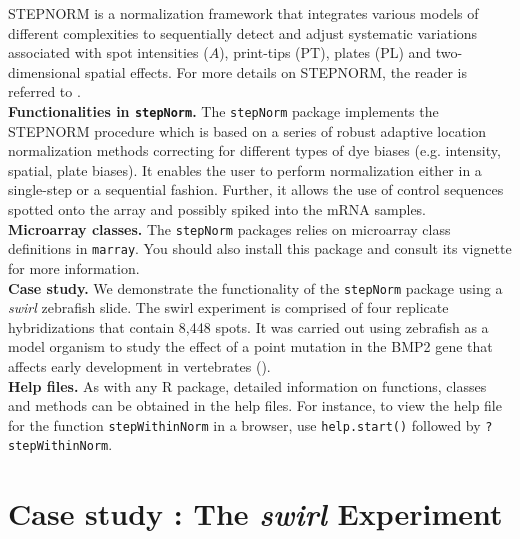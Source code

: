\documentclass[11pt]{article}
\newcommand{\code}[1]{{\tt #1}}
\newcommand{\Rfunc}[1]{{\tt #1}}
\begin{document}
STEPNORM is a normalization framework that integrates various models of different 
complexities to sequentially detect and adjust systematic variations associated with spot 
intensities ($A$), print-tips (PT), plates (PL) and two-dimensional spatial effects. 
For more details on STEPNORM, the reader is referred to \cite{stepNorm}. \\

{\bf Functionalities in \code{stepNorm}.} The \code{stepNorm} package implements the 
STEPNORM procedure which is based on a series of robust adaptive location normalization 
methods correcting for different types of dye biases (e.g. intensity, spatial, plate biases).
It enables the user to perform normalization either in a single-step or a sequential
fashion. Further, it allows the use of control sequences spotted onto the array and 
possibly spiked into the mRNA samples.\\

{\bf Microarray classes.} The \code{stepNorm} packages relies on microarray class definitions in 
{\tt marray}. You should also install this package and consult its vignette for more information.\\

{\bf Case study.} We demonstrate the functionality of the {\tt stepNorm} package using 
a \emph{swirl} zebrafish slide. The swirl experiment is comprised of four replicate 
hybridizations that contain 8,448 spots. It was carried out using zebrafish as a model 
organism to study the effect of a point mutation in the BMP2 gene that affects early 
development in vertebrates (\cite{NormNAR}). \\

{\bf Help files.}  As with any R package, detailed information on functions, classes and 
methods can be obtained in the help files. For instance, to view the help file for the 
function \Rfunc{stepWithinNorm} in a browser, use \code{help.start()} followed by 
\code{?stepWithinNorm}.\\


\section{Case study : The \emph{swirl} Experiment}
\end{document}
